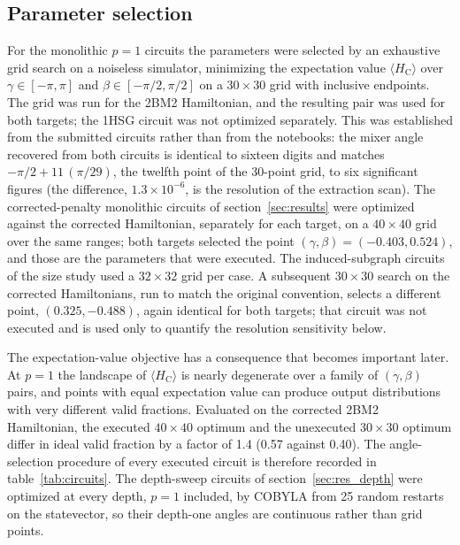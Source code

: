 \documentclass{iopjournal}
\newcommand{\Hc}{H_{\mathrm{C}}}
\begin{document}
\subsection{Parameter selection}
\label{sec:params}
For the monolithic $p=1$ circuits the parameters were selected by an exhaustive grid search on a noiseless simulator, minimizing the expectation value $\langle \Hc \rangle$ over $\gamma \in [-\pi,\pi]$ and $\beta \in [-\pi/2,\pi/2]$ on a $30\times30$ grid with inclusive endpoints. The grid was run for the 2BM2 Hamiltonian, and the resulting pair was used for both targets; the 1HSG circuit was not optimized separately. This was established from the submitted circuits rather than from the notebooks: the mixer angle recovered from both circuits is identical to sixteen digits and matches $-\pi/2 + 11\,(\pi/29)$, the twelfth point of the 30-point grid, to six significant figures (the difference, $1.3\times10^{-6}$, is the resolution of the extraction scan). The corrected-penalty monolithic circuits of section~\ref{sec:results} were optimized against the corrected Hamiltonian, separately for each target, on a $40\times40$ grid over the same ranges; both targets selected the point $(\gamma,\beta) = (-0.403, 0.524)$, and those are the parameters that were executed. The induced-subgraph circuits of the size study used a $32\times32$ grid per case. A subsequent $30\times30$ search on the corrected Hamiltonians, run to match the original convention, selects a different point, $(0.325, -0.488)$, again identical for both targets; that circuit was not executed and is used only to quantify the resolution sensitivity below.

The expectation-value objective has a consequence that becomes important later. At $p=1$ the landscape of $\langle \Hc \rangle$ is nearly degenerate over a family of $(\gamma,\beta)$ pairs, and points with equal expectation value can produce output distributions with very different valid fractions. Evaluated on the corrected 2BM2 Hamiltonian, the executed $40\times40$ optimum and the unexecuted $30\times30$ optimum differ in ideal valid fraction by a factor of 1.4 (0.57 against 0.40). The angle-selection procedure of every executed circuit is therefore recorded in table~\ref{tab:circuits}. The depth-sweep circuits of section~\ref{sec:res_depth} were optimized at every depth, $p=1$ included, by COBYLA from 25 random restarts on the statevector, so their depth-one angles are continuous rather than grid points.
\end{document}
